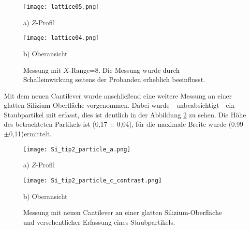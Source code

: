 \begin{figure}[H]
\centering
\begin{minipage}{0.45\textwidth}
\centering
		\texttt{[image: lattice05.png]}
		\caption*{a) $Z$-Profil}
	\end{minipage}
	\hfill
\begin{minipage}{0.45\textwidth}
\centering
		\texttt{[image: lattice04.png]}
		\caption*{b) Oberansicht}
	\end{minipage}
	\caption[Messung mit $X$-Range=8\micro\metre]{Messung mit $X$-Range=8\micro\metre. Die Messung wurde durch Schalleinwirkung seitens der Probanden erheblich beeinflusst.}
	\label{fig:Lattice2}
\end{figure}

Mit dem neuen Cantilever wurde anschließend eine weitere Messung an einer glatten Silizium-Oberfläche vorgenommen. Dabei wurde - unbeabsichtigt - ein Staubpartikel mit erfasst, dies ist deutlich in der Abbildung \ref{fig:Si_particle} zu sehen. Die Höhe des betrachteten Partikels ist (0,17 $\pm$ 0,04)\micro\metre, für die maximale Breite wurde (0.99$\pm$0,11)\micro\metre ermittelt.
\begin{figure}[H]
\centering
	\begin{minipage}{0.45\textwidth}
	\centering
		\texttt{[image: Si\_tip2\_particle\_a.png]}
		\caption*{a) $Z$-Profil}
	\end{minipage}
	\hfill
	\begin{minipage}{0.45\textwidth}
	\centering
		\texttt{[image: Si\_tip2\_particle\_c\_contrast.png]}
	\caption*{b) Oberansicht}
	\end{minipage}
	\caption[Messung mit Staubpartikel]{Messung mit neuen Cantilever an einer glatten Silizium-Oberfläche und versehentlicher Erfassung eines Staubpartikels.}
	\label{fig:Si_particle}
\end{figure}


